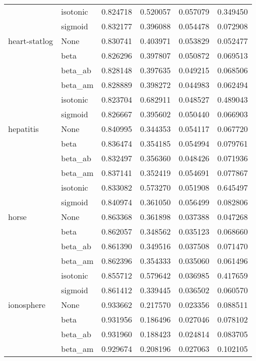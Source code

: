\begin{tabular}{llrrrr}
        & isotonic &  0.824718 &  0.520057 &  0.057079 &  0.349450 \\
        & sigmoid &  0.832177 &  0.396088 &  0.054478 &  0.072908 \\
heart-statlog & None &  0.830741 &  0.403971 &  0.053829 &  0.052477 \\
        & beta &  0.826296 &  0.397807 &  0.050872 &  0.069513 \\
        & beta\_ab &  0.828148 &  0.397635 &  0.049215 &  0.068506 \\
        & beta\_am &  0.828889 &  0.398272 &  0.044983 &  0.062494 \\
        & isotonic &  0.823704 &  0.682911 &  0.048527 &  0.489043 \\
        & sigmoid &  0.826667 &  0.395602 &  0.050440 &  0.066903 \\
hepatitis & None &  0.840995 &  0.344353 &  0.054117 &  0.067720 \\
        & beta &  0.836474 &  0.354185 &  0.054994 &  0.079761 \\
        & beta\_ab &  0.832497 &  0.356360 &  0.048426 &  0.071936 \\
        & beta\_am &  0.837141 &  0.352419 &  0.054691 &  0.077867 \\
        & isotonic &  0.833082 &  0.573270 &  0.051908 &  0.645497 \\
        & sigmoid &  0.840974 &  0.361050 &  0.056499 &  0.082806 \\
horse & None &  0.863368 &  0.361898 &  0.037388 &  0.047268 \\
        & beta &  0.862057 &  0.348562 &  0.035123 &  0.068660 \\
        & beta\_ab &  0.861390 &  0.349516 &  0.037508 &  0.071470 \\
        & beta\_am &  0.862396 &  0.354333 &  0.035060 &  0.061496 \\
        & isotonic &  0.855712 &  0.579642 &  0.036985 &  0.417659 \\
        & sigmoid &  0.861412 &  0.339445 &  0.036502 &  0.060570 \\
ionosphere & None &  0.933662 &  0.217570 &  0.023356 &  0.088511 \\
        & beta &  0.931956 &  0.186496 &  0.027046 &  0.078102 \\
        & beta\_ab &  0.931960 &  0.188423 &  0.024814 &  0.083705 \\
        & beta\_am &  0.929674 &  0.208196 &  0.027063 &  0.102105 \\

\end{tabular}
